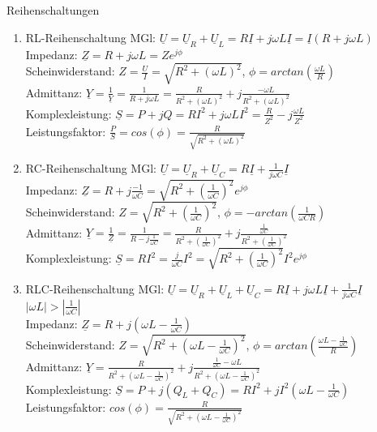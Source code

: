 \documentclass[german]{article}
\begin{document}
Reihenschaltungen
\begin{enumerate}
	\item RL-Reihenschaltung
		MGl: $\underline{U} = \underline{U}_R + \underline{U}_L = R \underline{I} + j\omega L \underline{I} = \underline{I} (R + j\omega L)$ \\
		Impedanz: $\underline{Z} = R + j \omega L = Z e^{j\phi}$ \\
		Scheinwiderstand: $Z = \frac{U}{I} = \sqrt{R^2 + (\omega L)^2}$, $\phi = arctan\left( \frac{\omega L}{R} \right)$ \\
		Admittanz: $\underline{Y} = \frac1{\underline{Y}} = \frac1{R + j\omega L} = \frac{R}{R^2 + (\omega L)^2} + j \frac{-\omega L}{R^2 + (\omega L)^2}$ \\
		Komplexleistung: $\underline{S} = P + j Q = RI^2 + j\omega L I^2 = \frac{R}{Z^2} - j\frac{\omega L}{Z^2}$ \\
		Leistungsfaktor: $\frac{P}{S} = cos(\phi) = \frac{R}{\sqrt{R^2 + (\omega L)^2}}$
	\item RC-Reihenschaltung
		MGl: $\underline{U} = \underline{U}_R + \underline{U}_C = R\underline{I} + \frac1{j\omega C} \underline{I}$ \\
		Impedanz: $\underline{Z} = R + j \frac{-1}{\omega C} = \sqrt{R^2 + \left( \frac1{\omega C} \right)^2} e^{j\phi}$ \\
		Scheinwiderstand: $Z = \sqrt{R^2 + \left( \frac1{\omega C} \right)^2}$, $\phi = - arctan\left( \frac1{\omega CR} \right)$ \\
		Admittanz: $\underline{Y} = \frac1{\underline{Z}} = \frac1{R - j \frac1{\omega C}} = \frac{R}{R^2 + \left( \frac1{\omega C} \right)^2} + j \frac{\frac1{\omega C}}{R^2 + \left( \frac1{\omega C} \right)^2}$ \\
		Komplexleistung: $\underline{S} = R I^2 = \frac{j}{\omega C} I^2 = \sqrt{R^2 + \left( \frac1{\omega C} \right)^2} I^2 e^{j\phi}$
	\item RLC-Reihenschaltung
		MGl: $\underline{U} = \underline{U}_R + \underline{U}_L + \underline{U}_C = R \underline{I} + j \omega L \underline{I} + \frac1{j \omega C} \underline{I}$ \\
		$| \omega L | > | \frac1{\omega C} |$ \\
		Impedanz: $\underline{Z} = R + j(\omega L - \frac1{\omega C})$ \\
		Scheinwiderstand: $Z = \sqrt{R^2 + \left( \omega L - \frac1{\omega C} \right)^2}$, $\phi = arctan\left( \frac{\omega L - \frac1{\omega C}}R \right)$ \\
		Admittanz: $\underline{Y} = \frac{R}{R^2 + \left( \omega L - \frac1{\omega C} \right)^2} + j \frac{\frac1{\omega C} - \omega L}{R^2 + \left( \omega L - \frac1{\omega C} \right)^2}$ \\
		Komplexleistung: $\underline{S} = P + j(Q_L + Q_C) = RI^2 + jI^2 \left( \omega L - \frac1{\omega C} \right)$ \\
		Leistungsfaktor: $cos(\phi) = \frac{R}{\sqrt{R^2 + \left( \omega L - \frac1{\omega C} \right)^2}}$
\end{enumerate}
\end{document}
